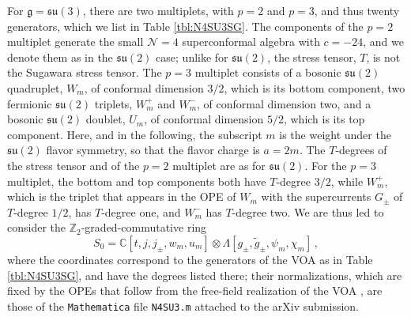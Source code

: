 \documentclass[12pt]{article}
\numberwithin{equation}{section}
\numberwithin{figure}{section}
\theoremstyle{plain}
\theoremstyle{definition}
\begin{document}
For $\mathfrak{g} = \mathfrak{su}(3)$, there are two multiplets, with $p = 2$ and $p = 3$, and thus twenty generators, which we list in Table \ref{tbl:N4SU3SG}. The components of the $p = 2$ multiplet generate the small $\mathcal{N}=4$ superconformal algebra with $c = -24$, and we denote them as in the $\mathfrak{su}(2)$ case; unlike for $\mathfrak{su}(2)$, the stress tensor, $T$, is not the Sugawara stress tensor. The $p = 3$ multiplet consists of a bosonic $\mathfrak{su}(2)$ quadruplet, $W_m$, of conformal dimension $3/2$, which is its bottom component, two fermionic $\mathfrak{su}(2)$ triplets, $W^+_m$ and $W^-_m$, of conformal dimension two, and a bosonic $\mathfrak{su}(2)$ doublet, $U_m$, of conformal dimension $5/2$, which is its top component. Here, and in the following, the subscript $m$ is the weight under the $\mathfrak{su}(2)$ flavor symmetry, so that the flavor charge is $a = 2m$. The $T$-degrees of the stress tensor and of the $p = 2$ multiplet are as for $\mathfrak{su}(2)$. For the $p = 3$ multiplet, the bottom and top components both have $T$-degree $3/2$, while $W^+_m$, which is the triplet that appears in the OPE of $W_m$ with the supercurrents $G_\pm$ of $T$-degree $1/2$, has $T$-degree one, and $W^-_m$ has $T$-degree two. We are thus led to consider the $\mathbb{Z}_2$-graded-commutative ring
\begin{equation}
    S_0 = \mathbb{C}[t, j, j_\pm, w_m, u_m] \otimes \Lambda[g_\pm, \widetilde{g}_\pm, \psi_m, \chi_m] \,,
\end{equation}
where the coordinates correspond to the generators of the VOA as in Table \ref{tbl:N4SU3SG}, and have the degrees listed there; their normalizations, which are fixed by the OPEs that follow from the free-field realization of the VOA \cite{Bonetti:2018fqz}, are those of the {\tt Mathematica} file {\tt N4SU3.m} attached to the arXiv submission.
\end{document}
